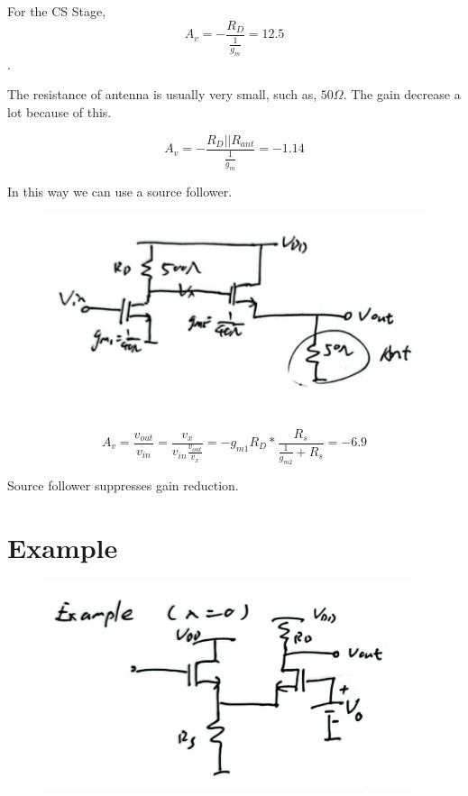 \documentclass[fontset=windows]{article}
\begin{document}
For the CS Stage, $$A_v=-\frac{R_D}{\frac{1}{g_m}}=12.5$$. 

The resistance of antenna is usually very small, such as, $50\Omega$. 
The gain decrease a lot because of this. 

$$A_v=-\frac{R_D||R_{ant}}{\frac{1}{g_m}}=-1.14$$

In this way we can use a source follower. 

\begin{figure}[htbp]
    \centering
    \includegraphics[scale=0.8]{8.jpg}
    \captionsetup{labelformat=empty}
    \caption{}
    \label{8}
\end{figure}

$$A_v=\frac{v_{out}}{v_{in}}=\frac{v_x}{v_{in}\frac{v_{out}}{v_x}}=-g_{m1}R_D*\frac{R_s}{\frac{1}{g_{m2}}+R_s}=-6.9$$

Source follower suppresses gain reduction. 

\section*{Example}

\begin{figure}[htbp]
    \centering
    \includegraphics[scale=0.8]{9.jpg}
    \captionsetup{labelformat=empty}
    \caption{}
    \label{9}
\end{figure}
\end{document}
